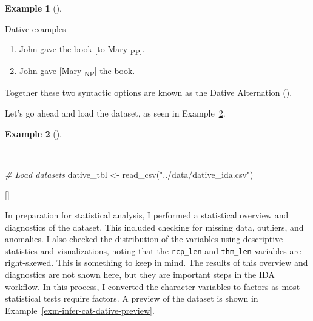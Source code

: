 \documentclass[
  letterpaper,
  krantz1]{latex/krantz-mod}
\newenvironment{Shaded}{\begin{snugshade}}{\end{snugshade}}
\newcommand{\CommentTok}[1]{\textcolor[rgb]{0.00,0.00,0.00}{\textit{#1}}}
\newcommand{\FunctionTok}[1]{\textcolor[rgb]{0.00,0.00,0.00}{#1}}
\newcommand{\NormalTok}[1]{\textcolor[rgb]{0.00,0.00,0.00}{#1}}
\newcommand{\OtherTok}[1]{\textcolor[rgb]{0.00,0.00,0.00}{#1}}
\newcommand{\StringTok}[1]{\textcolor[rgb]{0.00,0.00,0.00}{#1}}
\providecommand{\tightlist}{%
  \setlength{\itemsep}{0pt}\setlength{\parskip}{0pt}}\usepackage{longtable,booktabs,array}
\newcommand{\cindex}[1]{%
  \StrSubstitute{#1}{_}{\_}[\temp]%
  \index{\temp}%
}
\theoremstyle{definition}
\theoremstyle{definition}
\newtheorem{example}{Example}[chapter]
\theoremstyle{remark}
\begin{document}
\begin{example}[]\protect\hypertarget{exm-infer-cat-dative-examples}{}\label{exm-infer-cat-dative-examples}

Dative examples

\begin{enumerate}
\def\labelenumi{(\arabic{enumi})}
\tightlist
\item
  John gave the book {[}to Mary \textsubscript{PP}{]}.
\item
  John gave {[}Mary \textsubscript{NP}{]} the book.
\end{enumerate}

\end{example}

Together these two syntactic options are known as the Dative Alternation
().

Let's go ahead and load the dataset, as seen in
Example~\ref{exm-infer-cat-read-dative}.

\begin{example}[]\protect\hypertarget{exm-infer-cat-read-dative}{}\label{exm-infer-cat-read-dative}

~

\begin{Shaded}
\begin{Highlighting}[numbers=left,,]
\CommentTok{\# Load datasets}
\NormalTok{dative\_tbl }\OtherTok{\textless{}{-}}
  \FunctionTok{read\_csv}\NormalTok{(}\StringTok{"../data/dative\_ida.csv"}\NormalTok{)}
\end{Highlighting}
\end{Shaded}

 \cindex{read_csv()}

\end{example}

In preparation for statistical analysis, I performed a statistical
overview and diagnostics of the dataset.
This included checking for missing data,
outliers, and anomalies. I also checked the distribution
of the variables using descriptive
statistics and visualizations, noting that
the \texttt{rcp\_len} and \texttt{thm\_len} variables are
right-skewed. This is something to keep in
mind. The results of this overview and diagnostics are not shown here,
but they are important steps in the IDA workflow. In this process, I
converted the character variables to factors as most statistical tests
require factors. A preview of the dataset is shown in
Example~\ref{exm-infer-cat-dative-preview}.
\end{document}
